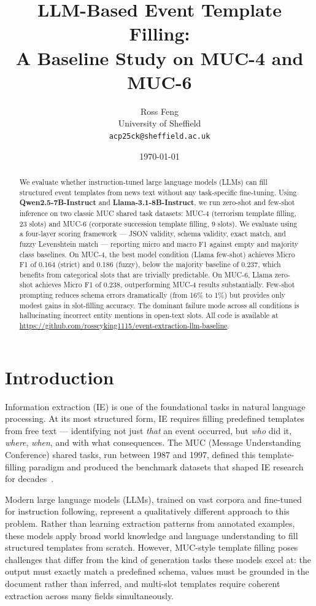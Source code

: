 \documentclass[11pt,a4paper]{article}
\title{\textbf{LLM-Based Event Template Filling:\\
A Baseline Study on MUC-4 and MUC-6}}
\author{
    Ross Feng\\
    \small University of Sheffield\\
    \small \texttt{acp25ck@sheffield.ac.uk}
}
\date{\today}
\begin{document}
\maketitle

\begin{abstract}
We evaluate whether instruction-tuned large language models (LLMs) can fill structured event templates from news text without any task-specific fine-tuning. Using \textbf{Qwen2.5-7B-Instruct} and \textbf{Llama-3.1-8B-Instruct}, we run zero-shot and few-shot inference on two classic MUC shared task datasets: MUC-4 (terrorism template filling, 23 slots) and MUC-6 (corporate succession template filling, 9 slots). We evaluate using a four-layer scoring framework — JSON validity, schema validity, exact match, and fuzzy Levenshtein match — reporting micro and macro F1 against empty and majority class baselines. On MUC-4, the best model condition (Llama few-shot) achieves Micro F1 of 0.164 (strict) and 0.186 (fuzzy), below the majority baseline of 0.237, which benefits from categorical slots that are trivially predictable. On MUC-6, Llama zero-shot achieves Micro F1 of 0.238, outperforming MUC-4 results substantially. Few-shot prompting reduces schema errors dramatically (from 16\% to 1\%) but provides only modest gains in slot-filling accuracy. The dominant failure mode across all conditions is hallucinating incorrect entity mentions in open-text slots. All code is available at \url{https://github.com/rosscyking1115/event-extraction-llm-baseline}.
\end{abstract}

\section{Introduction}

Information extraction (IE) is one of the foundational tasks in natural language processing. At its most structured form, IE requires filling predefined templates from free text — identifying not just \textit{that} an event occurred, but \textit{who} did it, \textit{where}, \textit{when}, and with what consequences. The MUC (Message Understanding Conference) shared tasks, run between 1987 and 1997, defined this template-filling paradigm and produced the benchmark datasets that shaped IE research for decades~\cite{sundheim1992muc,grishman1996muc6}.

Modern large language models (LLMs), trained on vast corpora and fine-tuned for instruction following, represent a qualitatively different approach to this problem. Rather than learning extraction patterns from annotated examples, these models apply broad world knowledge and language understanding to fill structured templates from scratch. However, MUC-style template filling poses challenges that differ from the kind of generation tasks these models excel at: the output must exactly match a predefined schema, values must be grounded in the document rather than inferred, and multi-slot templates require coherent extraction across many fields simultaneously.
\end{document}
